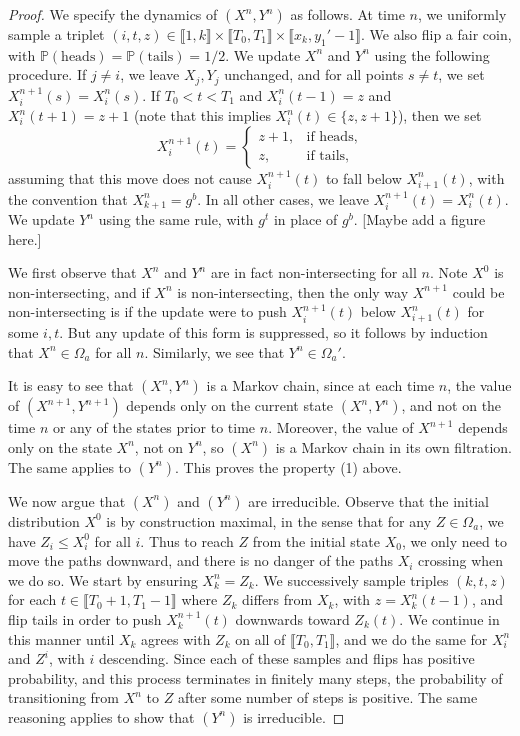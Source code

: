 \begin{proof}
	We specify the dynamics of $(X^n, Y^n)$ as follows. At time $n$, we uniformly sample a triplet $(i,t,z)\in \llbracket 1, k\rrbracket \times \llbracket T_0, T_1\rrbracket \times \llbracket x_k,y_1'-1\rrbracket$. We also flip a fair coin, with $\mathbb{P}(\textrm{heads})=\mathbb{P}(\textrm{tails})=1/2$. We update $X^n$ and $Y^n$ using the following procedure. If $j\neq i$, we leave $X_j,Y_j$ unchanged, and for all points $s\neq t$, we set $X^{n+1}_i(s) = X^n_i(s)$. If $T_0 < t < T_1$ and $X^n_i(t-1)=z$ and $X^n_i(t+1)=z+1$ (note that this implies $X^n_i(t)\in\{z,z+1\}$), then we set
	\[
	X^{n+1}_i(t) = \begin{cases}
	z+1, & \textrm{if heads},\\
	z, & \textrm{if tails},
	\end{cases}
	\]
	assuming that this move does not cause $X^{n+1}_i(t)$ to fall below $X^n_{i+1}(t)$, with the convention that $X^n_{k+1} = g^b$. In all other cases, we leave $X^{n+1}_i(t)=X^n_i(t)$. We update $Y^n$ using the same rule, with $g^t$ in place of $g^b$. [Maybe add a figure here.] 
	
	We first observe that $X^n$ and $Y^n$ are in fact non-intersecting for all $n$. Note $X^0$ is non-intersecting, and if $X^n$ is non-intersecting, then the only way $X^{n+1}$ could be non-intersecting is if the update were to push $X^{n+1}_i(t)$ below $X^n_{i+1}(t)$ for some $i,t$. But any update of this form is suppressed, so it follows by induction that $X^n\in\Omega_a$ for all $n$. Similarly, we see that $Y^n\in\Omega_a'$.
	
	It is easy to see that $(X^n,Y^n)$ is a Markov chain, since at each time $n$, the value of $(X^{n+1},Y^{n+1})$ depends only on the current state $(X^n,Y^n)$, and not on the time $n$ or any of the states prior to time $n$. Moreover, the value of $X^{n+1}$ depends only on the state $X^n$, not on $Y^n$, so $(X^n)$ is a Markov chain in its own filtration. The same applies to $(Y^n)$. This proves the property (1) above.
	
	We now argue that $(X^n)$ and $(Y^n)$ are irreducible. Observe that the initial distribution $X^0$ is by construction maximal, in the sense that for any $Z\in \Omega_a$, we have $Z_i \leq X^0_i$ for all $i$. Thus to reach $Z$ from the initial state $X_0$, we only need to move the paths downward, and there is no danger of the paths $X_i$ crossing when we do so. We start by ensuring $X^n_k = Z_k$. We successively sample triples $(k,t,z)$ for each $t\in \llbracket T_0+1, T_1-1\rrbracket$ where $Z_k$ differs from $X_k$, with $z=X^n_k(t-1)$, and flip tails in order to push $X^{n+1}_k(t)$ downwards toward $Z_k(t)$. We continue in this manner until $X_k$ agrees with $Z_k$ on all of $\llbracket T_0, T_1\rrbracket$, and we do the same for $X^n_i$ and $Z^i$, with $i$ descending. Since each of these samples and flips has positive probability, and this process terminates in finitely many steps, the probability of transitioning from $X^n$ to $Z$ after some number of steps is positive. The same reasoning applies to show that $(Y^n)$ is irreducible.
	

\end{proof}
